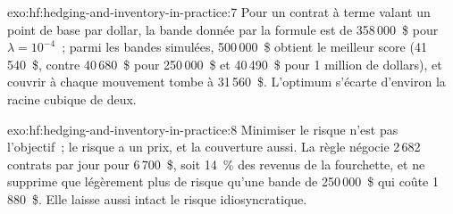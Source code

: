 \begin{solution}{exo:hf:hedging-and-inventory-in-practice:7}
Pour un contrat à terme valant un point de base par dollar, la bande donnée par la formule est de 358\,000~\$ pour $\lambda=10^{-4}$~; parmi les bandes simulées, 500\,000~\$ obtient le meilleur score
(41\,540~\$, contre 40\,680~\$ pour 250\,000~\$ et 40\,490~\$ pour 1 million de dollars), et couvrir à chaque mouvement tombe à 31\,560~\$. L'optimum s'écarte d'environ la
racine cubique de deux.
\end{solution}

\begin{solution}{exo:hf:hedging-and-inventory-in-practice:8}
Minimiser le risque n'est pas l'objectif~; le risque a un prix, et la couverture aussi. La règle négocie 2\,682 contrats par jour pour 6\,700~\$, soit 14~\% des
revenus de la fourchette, et ne supprime que légèrement plus de risque qu'une bande de 250\,000~\$ qui coûte 1\,880~\$. Elle laisse aussi intact le risque idiosyncratique.
\end{solution}

